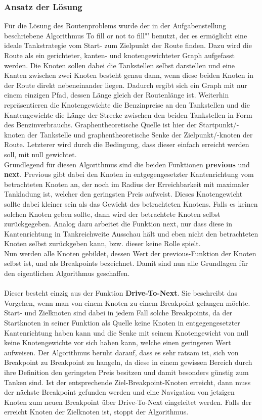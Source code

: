 \documentclass[11pt]{article}
\begin{document}
\subsubsection{Ansatz der Lösung}
	Für die Lösung des Routenproblems wurde der in der Aufgabenstellung beschriebene Algorithmus \glqq To fill or not to fill"' benutzt, der es ermöglicht eine ideale Tankstrategie vom Start- zum Zielpunkt der Route finden. Dazu wird die Route als ein gerichteter, kanten- und knotengewichteter Graph aufgefasst werden. Die Knoten sollen dabei die Tankstellen selbst darstellen und eine Kanten zwischen zwei Knoten besteht genau dann, wenn diese beiden Knoten in der Route direkt nebeneinander liegen. Dadurch ergibt sich ein Graph mit nur einem einzigen Pfad, dessen Länge gleich der Routenlänge ist. Weiterhin repräsentieren die Knotengewichte die Benzinpreise an den Tankstellen und die Kantengewichte die Länge der Strecke zwischen den beiden Tankstellen in Form des Benzinverbrauchs. Graphentheoretische Quelle ist hier der Startpunkt/-knoten der Tankstelle und graphentheoretische Senke der Zielpunkt/-knoten der Route. Letzterer wird durch die Bedingung, dass dieser einfach erreicht werden soll, mit null gewichtet.\\
	Grundlegend für diesen Algorithmus sind die beiden Funktionen \textbf{previous} und \textbf{next}. Previous gibt dabei den Knoten in entgegengesetzter Kantenrichtung vom betrachteten Knoten an, der  noch im Radius der Erreichbarkeit mit maximaler Tankladung ist, welcher den geringsten Preis aufweist. Dieses Knotengewicht sollte dabei kleiner sein als das Gewicht des betrachteten Knotens. Falls es keinen solchen Knoten geben sollte, dann wird der betrachtete Knoten selbst zurückgegeben. Analog dazu arbeitet die Funktion next, nur dass diese in Kantenrichtung in Tankreichweite Ausschau hält und eben nicht den betrachteten Knoten selbst zurückgeben kann, bzw. dieser keine Rolle spielt. \\
	Nun werden alle Knoten gebildet, dessen Wert der previous-Funktion der Knoten selbst ist, und als \glqq Breakpoints\glqq{} bezeichnet. Damit sind nun alle Grundlagen für den eigentlichen Algorithmus geschaffen. \\ \\
	Dieser besteht einzig aus der Funktion \textbf{Drive-To-Next}. Sie beschreibt das Vorgehen, wenn man von einem Knoten zu einem Breakpoint gelangen möchte. Start- und Zielknoten sind dabei in jedem Fall solche Breakpoints, da der Startknoten in seiner Funktion als Quelle keine Knoten in entgegengesetzter Kantenrichtung haben kann und die Senke mit seinem Knotengewicht von null keine Knotengewichte vor sich haben kann, welche einen geringeren Wert aufweisen. Der Algorithmus beruht darauf, dass es sehr ratsam ist, sich von Breakpoint zu Breakpoint zu hangeln, da diese in einem gewissen Bereich durch ihre Definition den geringsten Preis besitzen und damit besonders günstig zum Tanken sind. Ist der entsprechende Ziel-Breakpoint-Knoten erreicht, dann muss der nächste Breakpoint gefunden werden und eine Navigation von jetzigen Knoten zum neuen Breakpoint über Drive-To-Next eingeleitet werden. Falls der erreicht Knoten der Zielknoten ist, stoppt der Algorithmus. \\
\end{document}

